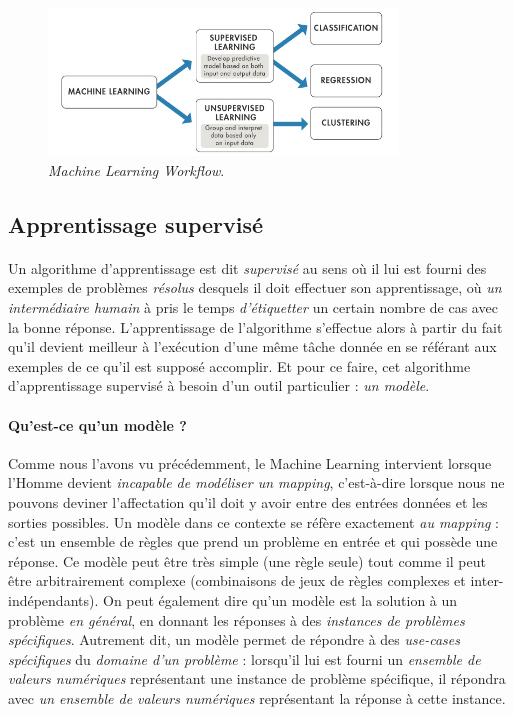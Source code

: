 \begin{figure}[ht]
    \centering
    \includegraphics[width=350px]{chapters/03/images/machine-learning.png}
    \caption{\label{machine learning}\emph{Machine Learning Workflow}.}
\end{figure}


\subsection*{Apprentissage supervisé}

\paragraph{} Un algorithme d'apprentissage est dit \emph{supervisé} au sens où il lui est fourni des exemples de problèmes \emph{résolus} desquels
il doit effectuer son apprentissage, où \emph{un intermédiaire humain} à pris le temps \emph{d'étiquetter} un certain nombre de cas avec la bonne réponse.
L'apprentissage de l'algorithme s'effectue alors à partir du fait qu'il devient meilleur à l'exécution d'une même tâche donnée en se référant aux exemples
de ce qu'il est supposé accomplir. Et pour ce faire, cet algorithme d'apprentissage supervisé à besoin d'un outil particulier : \emph{un modèle}.

\paragraph{Qu'est-ce qu'un modèle ?} Comme nous l'avons vu précédemment, le Machine Learning intervient lorsque l'Homme devient \emph{incapable de modéliser un mapping},
c'est-à-dire lorsque nous ne pouvons deviner l'affectation qu'il doit y avoir entre des entrées données et les sorties possibles. Un modèle dans ce contexte se réfère 
exactement \emph{au mapping} : c'est un ensemble de règles que prend un problème en entrée et qui possède une réponse. Ce modèle peut être très simple (une règle seule)
tout comme il peut être arbitrairement complexe (combinaisons de jeux de règles complexes et inter-indépendants). On peut également dire qu'un modèle est la solution à un problème
\emph{en général}, en donnant les réponses à des \emph{instances de problèmes spécifiques}. Autrement dit, un modèle permet de répondre à des \emph{use-cases spécifiques} du
\emph{domaine d'un problème} \cite{MachineLearning3} : lorsqu'il lui est fourni un \emph{ensemble de valeurs numériques} représentant une instance de problème spécifique, il répondra
avec \emph{un ensemble de valeurs numériques} représentant la réponse à cette instance.

